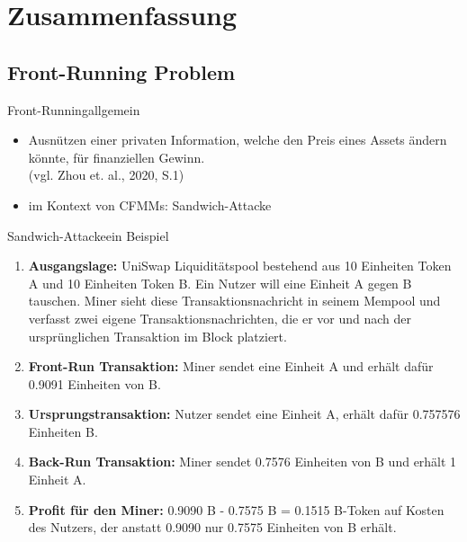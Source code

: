 \documentclass{beamer}
\begin{document}
\section{Zusammenfassung}

\subsection{Front-Running Problem}

\begin{frame}{Front-Running}{allgemein}
\begin{itemize}
	\item<1->{\glqq Ausnützen einer privaten Information, welche den Preis eines Assets ändern könnte, für finanziellen Gewinn.\grqq \\
	\tiny{(vgl. Zhou et. al., 2020, S.1)}}
	\vspace{1em}
	\item<2->{im Kontext von CFMMs: Sandwich-Attacke}
\end{itemize}
\end{frame}


\begin{frame}{Sandwich-Attacke}{ein Beispiel}
\begin{enumerate}
	\item<1->{\textbf{Ausgangslage:} UniSwap Liquiditätspool bestehend aus 10 Einheiten Token A und 10 Einheiten Token B.  Ein Nutzer will eine Einheit A gegen B tauschen. Miner sieht diese Transaktionsnachricht in seinem Mempool und verfasst zwei eigene Transaktionsnachrichten, die er vor und nach der ursprünglichen Transaktion im Block platziert.}
	\item<2->{\textbf{Front-Run Transaktion:} Miner sendet eine Einheit A und erhält dafür 0.9091 Einheiten von B.}
	\item<2->{\textbf{Ursprungstransaktion:} Nutzer sendet eine Einheit A, erhält dafür 0.757576 Einheiten B.}
	\item<2->{\textbf{Back-Run Transaktion:} Miner sendet 0.7576 Einheiten von B und erhält 1 Einheit A.	}
	\item<3->{\textbf{Profit für den Miner:} 0.9090 B - 0.7575 B = 0.1515 B-Token auf Kosten des Nutzers, der anstatt 0.9090 nur 0.7575 Einheiten von B erhält.}
\end{enumerate}
\end{frame}
\end{document}
